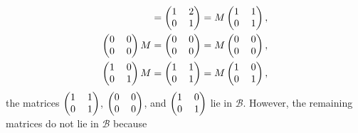 \begin{enumerate}
\begin{align*}
            &= \left(
            \begin{tabular}{@{}l r@{}} 
               1 & 2 \\ 
               0 & 1
            \end{tabular}\right) = M
         \left(\begin{tabular}{@{}l r@{}} 1 & 1 \\ 0 & 1\end{tabular}\right), \\
         \left(\begin{tabular}{@{}l r@{}} 0 & 0 \\ 0 & 0\end{tabular}\right)M 
            &= \left(
            \begin{tabular}{@{}l r@{}} 
               0 & 0 \\ 
               0 & 0
            \end{tabular}\right) = M
         \left(\begin{tabular}{@{}l r@{}} 0 & 0 \\ 0 & 0\end{tabular}\right), \\
         \left(\begin{tabular}{@{}l r@{}} 1 & 0 \\ 0 & 1\end{tabular}\right)M 
            &= \left(
            \begin{tabular}{@{}l r@{}} 
               1 & 1 \\ 
               0 & 1
            \end{tabular}\right) = M
         \left(\begin{tabular}{@{}l r@{}} 1 & 0 \\ 0 & 1\end{tabular}\right),
         \end{align*}
         the matrices $\left(\begin{tabular}{@{}l r@{}} 
         1 & 1 \\ 
         0 & 1
      \end{tabular}\right)$, $\left(\begin{tabular}{@{}l r@{}} 
         0 & 0 \\ 
         0 & 0
      \end{tabular}\right)$, and $\left(\begin{tabular}{@{}l r@{}} 
         1 & 0 \\ 
         0 & 1
      \end{tabular}\right)$ lie in $\mathcal{B}$. However, the remaining 
      matrices do not lie in $\mathcal{B}$ because
         

\end{enumerate}
